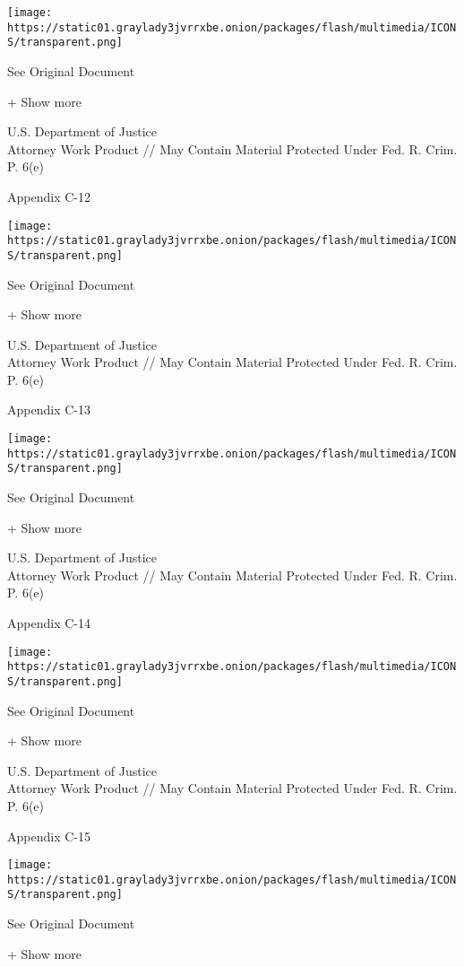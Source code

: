 \protect\hyperlink{}{}

\texttt{[image: https://static01.graylady3jvrrxbe.onion/packages/flash/multimedia/ICONS/transparent.png]}

See Original Document

+ Show more

U.S. Department of Justice\\
Attorney Work Product // May Contain Material Protected Under Fed. R.
Crim. P. 6(e)

Appendix C-12

\protect\hyperlink{}{}

\texttt{[image: https://static01.graylady3jvrrxbe.onion/packages/flash/multimedia/ICONS/transparent.png]}

See Original Document

+ Show more

U.S. Department of Justice\\
Attorney Work Product // May Contain Material Protected Under Fed. R.
Crim. P. 6(e)

Appendix C-13

\protect\hyperlink{}{}

\texttt{[image: https://static01.graylady3jvrrxbe.onion/packages/flash/multimedia/ICONS/transparent.png]}

See Original Document

+ Show more

U.S. Department of Justice\\
Attorney Work Product // May Contain Material Protected Under Fed. R.
Crim. P. 6(e)

Appendix C-14

\protect\hyperlink{}{}

\texttt{[image: https://static01.graylady3jvrrxbe.onion/packages/flash/multimedia/ICONS/transparent.png]}

See Original Document

+ Show more

U.S. Department of Justice\\
Attorney Work Product // May Contain Material Protected Under Fed. R.
Crim. P. 6(e)

Appendix C-15

\protect\hyperlink{}{}

\texttt{[image: https://static01.graylady3jvrrxbe.onion/packages/flash/multimedia/ICONS/transparent.png]}

See Original Document

+ Show more

